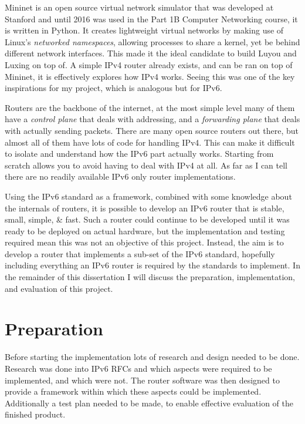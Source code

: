 \documentclass[12pt,a4paper,twoside,openright]{report}
\begin{document}
\bigskip

Mininet\cite{mininet} is an open source virtual network simulator that was developed at Stanford and until 2016 was used in the Part 1B Computer Networking course, it is written in Python.  It creates lightweight virtual networks by making use of Linux's \textit{networked namespaces}, allowing processes to share a kernel, yet be behind different network interfaces. This made it the ideal candidate to build Luyou and Luxing on top of. A simple IPv4 router\cite{simple_router} already exists, and can be ran on top of Mininet, it is effectively explores how IPv4 works.  Seeing this was one of the key inspirations for my project, which is analogous but for IPv6.

\bigskip

Routers are the backbone of the internet, at the most simple level many of them have a \textit{control plane} that deals with addressing, and a \textit{forwarding plane} that deals with actually sending packets. There are many open source routers out there, but almost all of them have lots of code for handling IPv4. This can make it difficult to isolate and understand how the IPv6 part actually works.  Starting from scratch allows you to avoid having to deal with IPv4 at all.  As far as I can tell there are no readily available IPv6 only router implementations.

\bigskip

Using the IPv6 standard as a framework, combined with some knowledge about the internals of routers, it is possible to develop an IPv6 router that is stable, small, simple, \& fast.  Such a router could continue to be developed until it was ready to be deployed on actual hardware, but the implementation and testing required mean this was not an objective of this project.  Instead, the aim is to develop a router that implements a sub-set of the IPv6 standard, hopefully including everything an IPv6 router is required by the standards to implement.  In the remainder of this dissertation I will discuss the preparation, implementation, and evaluation of this project.

\chapter{Preparation}
\label{chap::preperation}

Before starting the implementation lots of research and design needed to be done. Research was done into IPv6 RFCs\cite{ipv6_rfc} and which aspects were required to be implemented, and which were not. The router software was then designed to provide a framework within which these aspects could be implemented.  Additionally a test plan needed to be made, to enable effective evaluation of the finished product.
\end{document}
